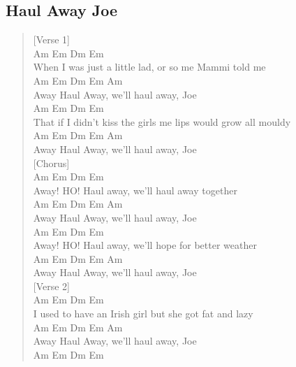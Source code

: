 \documentclass[11pt]{article}
\begin{document}
\subsection{Haul Away Joe}
\label{sec:org452cbf3}
\begin{verse}
[Verse 1]\\
\hspace*{5em}Am           Em              Dm          Em\\
When I was just a little lad, or so me Mammi told me\\
Am         Em         Dm   Em    Am\\
Away Haul Away, we'll haul away, Joe\\
\hspace*{5em}Am           Em              Dm                    Em\\
That if I didn't kiss the girls me lips would grow all mouldy\\
Am         Em         Dm   Em    Am\\
Away Haul Away, we'll haul away, Joe\\
\vspace*{1em}
\vspace*{1em}
[Chorus]\\
Am        Em              Dm          Em\\
Away! HO! Haul away, we'll haul away together\\
Am         Em         Dm   Em    Am\\
Away Haul Away, we'll haul away, Joe\\
Am        Em               Dm              Em\\
Away! HO! Haul away, we'll hope for better weather\\
Am         Em         Dm   Em    Am\\
Away Haul Away, we'll haul away, Joe\\
\vspace*{1em}
\vspace*{1em}
[Verse 2]\\
\hspace*{2em}Am              Em              Dm             Em\\
I used to have an Irish girl but she got fat and lazy\\
Am         Em         Dm   Em    Am\\
Away Haul Away, we'll haul away, Joe\\
\hspace*{4em}Am              Em              Dm                 Em\\

\end{verse}
\end{document}
